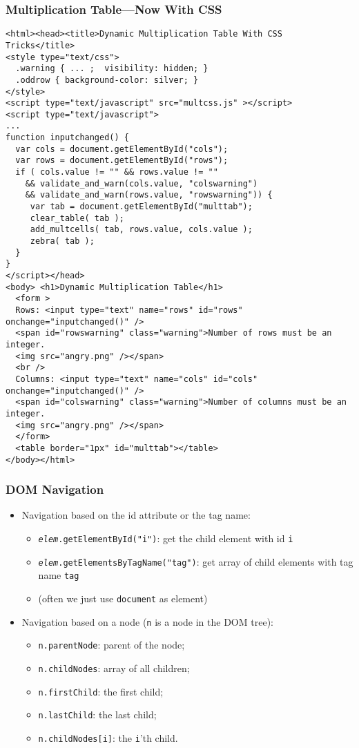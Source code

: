 \documentclass[svgnames]{beamer}
\begin{document}
\begin{frame}[fragile=singleslide] 
\frametitle{Multiplication Table---Now With CSS}
\begin{tiny}
\begin{verbatim}
<html><head><title>Dynamic Multiplication Table With CSS Tricks</title>
<style type="text/css">
  .warning { ... ;  visibility: hidden; }
  .oddrow { background-color: silver; }
</style>
<script type="text/javascript" src="multcss.js" ></script>
<script type="text/javascript">
...
function inputchanged() {
  var cols = document.getElementById("cols");
  var rows = document.getElementById("rows");
  if ( cols.value != "" && rows.value != "" 
    && validate_and_warn(cols.value, "colswarning") 
    && validate_and_warn(rows.value, "rowswarning")) {   
     var tab = document.getElementById("multtab");
     clear_table( tab );
     add_multcells( tab, rows.value, cols.value );
     zebra( tab );
  }
}
</script></head>
<body> <h1>Dynamic Multiplication Table</h1>
  <form >
  Rows: <input type="text" name="rows" id="rows" onchange="inputchanged()" /> 
  <span id="rowswarning" class="warning">Number of rows must be an integer. 
  <img src="angry.png" /></span>
  <br />
  Columns: <input type="text" name="cols" id="cols" onchange="inputchanged()" />
  <span id="colswarning" class="warning">Number of columns must be an integer.
  <img src="angry.png" /></span>
  </form> 
  <table border="1px" id="multtab"></table>
</body></html>
\end{verbatim}
\end{tiny}
\end{frame}


\begin{frame}\frametitle{DOM Navigation}

  \begin{itemize}
  \item Navigation based on the id attribute or the tag name:
    \begin{itemize}
    \item \texttt{\textit{elem}.getElementById("i")}: get the child
      element with id \texttt{i}
    \item \texttt{\textit{elem}.getElementsByTagName("tag")}: get
      array of child elements with tag name \texttt{tag}
    \item (often we just use \texttt{document} as element)
    \end{itemize}

  \item Navigation based on a node (\texttt{n} is a node in the
    DOM tree):
    \begin{itemize}
    \item \texttt{n.parentNode}: parent of the node;
    \item \texttt{n.childNodes}: array of all children;
    \item \texttt{n.firstChild}: the first child;
    \item \texttt{n.lastChild}: the last child;
    \item \texttt{n.childNodes[i]}: the \texttt{i}'th child.
    \end{itemize}
  \end{itemize}
\end{frame}
\end{document}

